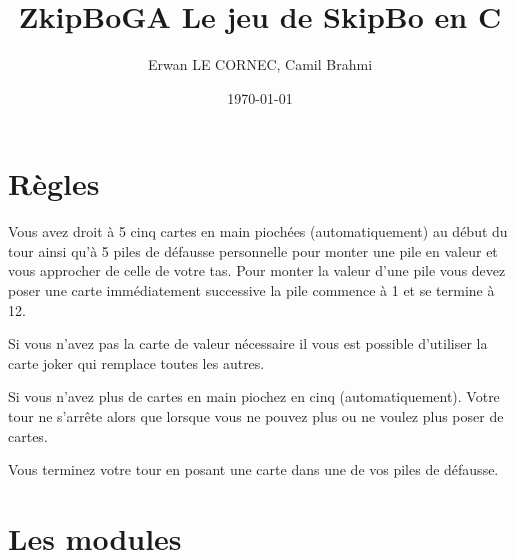 \documentclass[10pt,a4paper]{article}
\title{\textbf{ZkipBoGA} Le jeu de SkipBo en C}
\author{Erwan LE CORNEC, Camil Brahmi}
\date{\today}
\begin{document}
\maketitle

\newpage

\section{Règles}

Vous avez droit à 5 cinq cartes en main piochées (automatiquement) au début du tour ainsi qu'à 5 piles de défausse personnelle pour monter une pile en valeur et vous approcher de celle de votre tas.
Pour monter la valeur d'une pile vous devez poser une carte immédiatement successive la pile commence  à 1 et se termine à 12.

Si vous n'avez pas la carte de valeur nécessaire il vous est possible d'utiliser la carte joker qui remplace toutes les autres.

Si vous n'avez plus de cartes en main piochez en cinq (automatiquement).
Votre tour ne s'arrête alors que lorsque vous ne pouvez plus ou ne voulez plus poser de cartes.

Vous terminez votre tour en posant une carte dans une de vos piles de défausse.

\section{Les modules}
\end{document}
